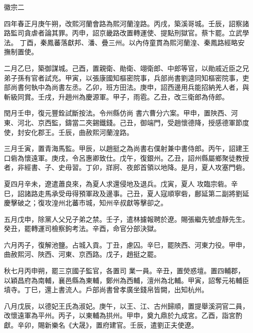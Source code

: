 
\begin{pinyinscope}

 徽宗二



 四年春正月庚午朔，改熙河蘭會路為熙河蘭湟路。丙戌，築溪哥城。壬辰，詔察諸路監司貪虐者論其罪。丙申，詔京畿路改置轉運使、提點刑獄官。蔡卞罷。立武學法。
 丁酉，秦鳳蕃落獻邦、潘、疊三州。以內侍童貫為熙河蘭湟、秦鳳路經略安撫制置使。



 二月乙巳，築御謀城。己酉，置親衛、勛衛、翊衛郎、中郎等官，以勛戚近臣之兄弟子孫有官者試充。甲寅，以張康國知樞密院事，兵部尚書劉逵同知樞密院事，吏部尚書何執中為尚書左丞。乙卯，班方田法。庚申，詔西邊用兵能招納羌人者，與斬級同賞。壬戌，升趙州為慶源軍。甲子，雨雹。乙丑，改三衛郎為侍郎。



 閏月壬申，復元豐銓試斷按法。令州縣仿尚
 書六曹分六案。甲申，置陜西、河東、河北、京西監，鑄當二夾錫鐵錢。己丑，御端門，受趙懷德降，授感德軍節度使，封安化郡王。壬辰，曲赦熙河蘭湟路。



 三月壬寅，置青海馬監。甲辰，以趙挺之為尚書右僕射兼中書侍郎。丙午，詔建王口砦為懷遠軍。庚戌，令呂惠卿致仕。戊午，復銀州。乙丑，詔州縣屬鄉聚徒教授者，非經書、子、史毋習。丁卯，牂牁、夜郎首領以地降。是月，夏人攻塞門砦。



 夏四月辛未，遼遣蕭良來，為夏人求還侵地及退兵。戊寅，夏人
 攻臨宗砦。辛巳，詔諸路走馬承受毋得預軍政及邊事。己丑，夏人寇順寧砦，鄜延第二副將劉延慶擊破之；復攻湟州北蕃市城，知州辛叔獻等擊卻之。



 五月戊申，除黨人父兄子弟之禁。壬子，遣林攄報聘於遼。賜張繼先號虛靜先生。癸丑，罷轉運司檢察鉤考法。辛酉，命官分部決獄。



 六月丙子，復解池鹽。占城入貢。丁丑，慮囚。辛巳，罷陜西、河東力役。甲申，曲赦熙河、陜西、河東、京西路。戊子，趙挺之罷。



 秋七月丙申朔，罷三京國子監官，各置司
 業一員。辛丑，置熒惑壇。置四輔郡，以穎昌府為南輔，襄邑縣為東輔，鄭州為西輔，澶州為北輔。甲寅，詔奪元祐輔臣墳寺。丁巳，還上書流人。戶部尚書曾孝廣坐錢帛皆闕，出知杭州。



 八月戊辰，以德妃王氏為淑妃。庚午，以王、江、古州歸順，置提舉溪洞官二員，改懷遠軍為平州。丙子，以東輔為拱州。甲申，奠九鼎於九成宮。乙酉，詣宮酌獻。辛卯，賜新樂名《大晟》，置府建官。壬辰，遣劉正夫使遼。




\end{pinyinscope}

